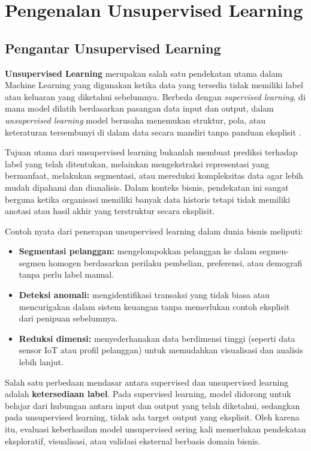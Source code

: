 \chapter{Pengenalan Unsupervised Learning}

\section{Pengantar Unsupervised Learning}

\textbf{Unsupervised Learning} merupakan salah satu pendekatan utama dalam Machine Learning yang digunakan ketika data yang tersedia tidak memiliki label atau keluaran yang diketahui sebelumnya. Berbeda dengan \textit{supervised learning}, di mana model dilatih berdasarkan pasangan data input dan output, dalam \textit{unsupervised learning} model berusaha menemukan struktur, pola, atau keteraturan tersembunyi di dalam data secara mandiri tanpa panduan eksplisit \cite{hastie2009elements}.

Tujuan utama dari unsupervised learning bukanlah membuat prediksi terhadap label yang telah ditentukan, melainkan mengekstraksi representasi yang bermanfaat, melakukan segmentasi, atau mereduksi kompleksitas data agar lebih mudah dipahami dan dianalisis. Dalam konteks bisnis, pendekatan ini sangat berguna ketika organisasi memiliki banyak data historis tetapi tidak memiliki anotasi atau hasil akhir yang terstruktur secara eksplisit.

Contoh nyata dari penerapan unsupervised learning dalam dunia bisnis meliputi:
\begin{itemize}
	\item \textbf{Segmentasi pelanggan:} mengelompokkan pelanggan ke dalam segmen-segmen homogen berdasarkan perilaku pembelian, preferensi, atau demografi tanpa perlu label manual.
	\item \textbf{Deteksi anomali:} mengidentifikasi transaksi yang tidak biasa atau mencurigakan dalam sistem keuangan tanpa memerlukan contoh eksplisit dari penipuan sebelumnya.
	\item \textbf{Reduksi dimensi:} menyederhanakan data berdimensi tinggi (seperti data sensor IoT atau profil pelanggan) untuk memudahkan visualisasi dan analisis lebih lanjut.
\end{itemize}

Salah satu perbedaan mendasar antara supervised dan unsupervised learning adalah \textbf{ketersediaan label}. Pada supervised learning, model didorong untuk belajar dari hubungan antara input dan output yang telah diketahui, sedangkan pada unsupervised learning, tidak ada target output yang eksplisit. Oleh karena itu, evaluasi keberhasilan model unsupervised sering kali memerlukan pendekatan eksploratif, visualisasi, atau validasi eksternal berbasis domain bisnis.

